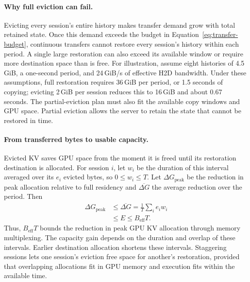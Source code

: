 \paragraph{Why full eviction can fail.}
Evicting every session's entire history makes transfer demand grow with total retained state.
Once this demand exceeds the budget in Equation~\ref{eq:transfer-budget}, continuous transfers cannot restore every session's history within each period.
A single large restoration can also exceed its available window or require more destination space than is free.
For illustration, assume eight histories of 4.5\,GiB, a one-second period, and 24\,GiB/s of effective H2D bandwidth.
Under these assumptions, full restoration requires 36\,GiB per period, or 1.5 seconds of copying; evicting 2\,GiB per session reduces this to 16\,GiB and about 0.67 seconds.
The partial-eviction plan must also fit the available copy windows and GPU space.
Partial eviction allows the server to retain the state that cannot be restored in time.

\paragraph{From transferred bytes to usable capacity.}
Evicted KV saves GPU space from the moment it is freed until its restoration destination is allocated.
For session $i$, let $w_i$ be the duration of this interval averaged over its $e_i$ evicted bytes, so $0\le w_i\le T$.
Let $\Delta G_{\mathrm{peak}}$ be the reduction in peak allocation relative to full residency and $\overline{\Delta G}$ the average reduction over the period.
Then
\begin{equation}
  \begin{aligned}
    \Delta G_{\mathrm{peak}}
    &\le \overline{\Delta G}
    =\frac{1}{T}\sum_i e_i w_i \\
    &\le E\le B_{\mathrm{eff}}T.
  \end{aligned}
  \label{eq:memory-gain}
\end{equation}
Thus, $B_{\mathrm{eff}}T$ bounds the reduction in peak GPU KV allocation through memory multiplexing.
The capacity gain depends on the duration and overlap of these intervals.
Earlier destination allocation shortens these intervals.
Staggering sessions lets one session's eviction free space for another's restoration, provided that overlapping allocations fit in GPU memory and execution fits within the available time.
